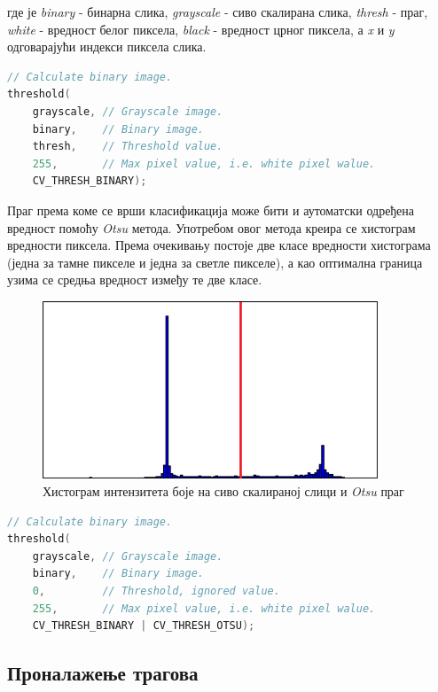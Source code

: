 \documentclass[12pt,a4paper,serbian,oneside]{book}
\begin{document}
где је \textit{binary} - бинарна слика, \textit{grayscale} - сиво скалирана слика, \textit{thresh} - праг, \textit{white} - вредност белог пиксела, \textit{black} - вредност црног пиксела, а \textit{x} и \textit{y} одговарајући индекси пиксела слика.

\begin{lstlisting}[language=C++,label=lst:grayscale,caption=Рачунање бинарне слике са унапред задатим прагом]
// Calculate binary image.
threshold(
    grayscale, // Grayscale image.
    binary,    // Binary image.
    thresh,    // Threshold value.
    255,       // Max pixel value, i.e. white pixel walue.
    CV_THRESH_BINARY);
\end{lstlisting}

Праг према коме се врши класификација може бити и аутоматски одређена вредност помоћу \textit{Otsu} метода. Употребом овог метода креира се хистограм вредности пиксела. Према очекивању постоје две класе вредности хистограма (једна за тамне пикселе и једна за светле пикселе), а као оптимална граница узима се средња вредност између те две класе.

\begin{figure}
\begin{center}
\includegraphics[width=100mm]{images/histogram.png}
\end{center}
\caption{Хистограм интензитета боје на сиво скалираној слици
и \textit{Otsu} праг}
\label{fig:otsu}
\end{figure}

 \begin{lstlisting}[language=C++,label=lst:grayscaleOtsu,caption=Рачунање бинарне слике са \textit{Otsu} прагом]
// Calculate binary image.
threshold(
    grayscale, // Grayscale image.
    binary,    // Binary image.
    0,         // Threshold, ignored value.
    255,       // Max pixel value, i.e. white pixel walue.
    CV_THRESH_BINARY | CV_THRESH_OTSU);
\end{lstlisting}

\subsection{Проналажење трагова}
\end{document}
